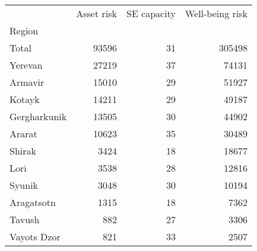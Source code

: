 \begin{tabular}{lrrr}
\toprule
{} &  Asset risk &  SE capacity &  Well-being risk \\
Region       &             &              &                  \\
\midrule
Total        &       93596 &           31 &           305498 \\
Yerevan      &       27219 &           37 &            74131 \\
Armavir      &       15010 &           29 &            51927 \\
Kotayk       &       14211 &           29 &            49187 \\
Gergharkunik &       13505 &           30 &            44902 \\
Ararat       &       10623 &           35 &            30489 \\
Shirak       &        3424 &           18 &            18677 \\
Lori         &        3538 &           28 &            12816 \\
Syunik       &        3048 &           30 &            10194 \\
Aragatsotn   &        1315 &           18 &             7362 \\
Tavush       &         882 &           27 &             3306 \\
Vayots Dzor  &         821 &           33 &             2507 \\
\bottomrule
\end{tabular}
